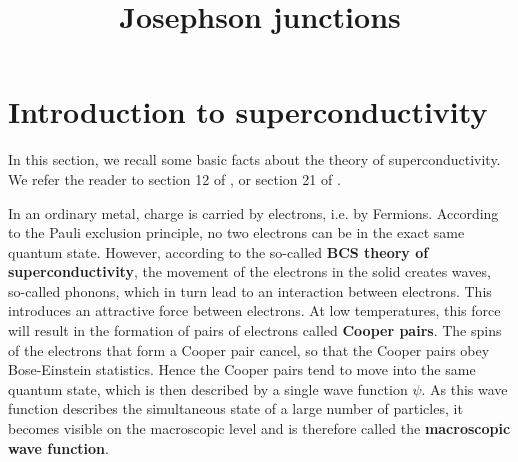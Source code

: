\documentclass[a4paper, draft]{article}
\title{Josephson junctions}
\theoremstyle{own}
\theoremstyle{remark}
\begin{document}
\maketitle




\section{Introduction to superconductivity}


In this section, we recall some basic facts about the theory of superconductivity. We refer the reader to section 12 of \cite{Kittel}, \cite{GrossMarxLectureNotes} or section 21 of \cite{FeynmanIII}.

In an ordinary metal, charge is carried by electrons, i.e. by Fermions. According to the Pauli exclusion principle, no two electrons can be in the exact same quantum state. However, according to the so-called {\bf BCS theory of superconductivity}, the movement of the electrons in the solid creates waves, so-called phonons, which in turn lead to an interaction between electrons. This introduces an attractive force between electrons. At low temperatures, this force will result in the formation of pairs of electrons called {\bf Cooper pairs}. The spins of the electrons that form a Cooper pair cancel, so that the Cooper pairs obey Bose-Einstein statistics. Hence the Cooper pairs tend to move into the same quantum state, which is then described by a single wave function $\psi$. As this wave function describes the simultaneous state of a large number of particles, it becomes visible on the macroscopic level and is therefore called the {\bf macroscopic wave function}. 
\end{document}

